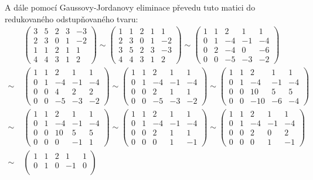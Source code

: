 \documentclass[11pt,a4paper]{article}
\newcommand{\aug}[1]{\left(\begin{array}{rrrr|r} #1 \end{array}\right)}
\begin{document}
A dále pomocí Gaussovy-Jordanovy eliminace převedu tuto matici do redukovaného odstup\-ňova\-ného tvaru:
\begin{align*}
  & \aug{
    3 & 5 & 2 & 3 & -3 \\
    2 & 3 & 0 & 1 & -2 \\
    1 & 1 & 2 & 1 & 1 \\
    4 & 4 & 3 & 1 & 2
  } \sim
  \aug{
    1 & 1 & 2 & 1 & 1 \\
    2 & 3 & 0 & 1 & -2 \\
    3 & 5 & 2 & 3 & -3 \\
    4 & 4 & 3 & 1 & 2
  } \sim
  \aug{
    1 & 1 & 2 & 1 & 1 \\
    0 & 1 & -4 & -1 & -4 \\
    0 & 2 & -4 & 0 & -6 \\
    0 & 0 & -5 & -3 & -2
  } \\[1ex]
  \sim\; & \aug{
    1 & 1 & 2 & 1 & 1 \\
    0 & 1 & -4 & -1 & -4 \\
    0 & 0 & 4 & 2 & 2 \\
    0 & 0 & -5 & -3 & -2
  } \sim
  \aug{
    1 & 1 & 2 & 1 & 1 \\
    0 & 1 & -4 & -1 & -4 \\
    0 & 0 & 2 & 1 & 1 \\
    0 & 0 & -5 & -3 & -2
  } \sim
  \aug{
    1 & 1 & 2 & 1 & 1 \\
    0 & 1 & -4 & -1 & -4 \\
    0 & 0 & 10 & 5 & 5 \\
    0 & 0 & -10 & -6 & -4
  } \\[1ex]
  \sim\; & \aug{
    1 & 1 & 2 & 1 & 1 \\
    0 & 1 & -4 & -1 & -4 \\
    0 & 0 & 10 & 5 & 5 \\
    0 & 0 & 0 & -1 & 1
  } \sim
  \aug{
    1 & 1 & 2 & 1 & 1 \\
    0 & 1 & -4 & -1 & -4 \\
    0 & 0 & 2 & 1 & 1 \\
    0 & 0 & 0 & 1 & -1
  } \sim
  \aug{
    1 & 1 & 2 & 1 & 1 \\
    0 & 1 & -4 & -1 & -4 \\
    0 & 0 & 2 & 0 & 2 \\
    0 & 0 & 0 & 1 & -1
  } \\[1ex]
  \sim\; & \aug{
    1 & 1 & 2 & 1 & 1 \\
    0 & 1 & 0 & -1 & 0 \\
}
\end{align*}
\end{document}
